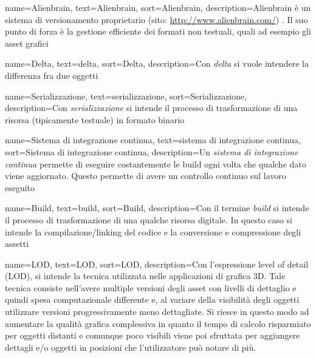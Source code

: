 {
	name=Alienbrain\textsuperscript{\textregistered},
	text=Alienbrain\textsuperscript{\textregistered},
	sort=Alienbrain,
	description={Alienbrain\textsuperscript{\textregistered} è un sistema di versionamento proprietario (sito: \url{http://www.alienbrain.com/}) . Il suo punto di forza è la gestione efficiente dei formati non testuali, quali ad esempio gli asset grafici}
}

{
	name=Delta,
	text=delta,
	sort=Delta,
	description={Con \emph{delta} si vuole intendere la differenza fra due oggetti}
}

{
	name=Serializzazione,
	text=serializzazione,
	sort=Serializzazione,
	description={Con \emph{serializzazione} si intende il processo di trasformazione di una risorsa (tipicamente testuale) in formato binario}
}

{
	name=Sistema di integrazione continua,
	text=sistema di integrazione continua,
	sort=Sistema di integrazione continua,
	description={Un \emph{sistema di integrazione continua} permette di eseguire costantemente le build ogni volta che qualche dato viene aggiornato. Questo permette di avere un controllo continuo sul lavoro eseguito}
}

{
	name=Build,
	text=build,
	sort=Build,
	description={Con il termine \emph{build} si intende il processo di trasformazione di una qualche risorsa digitale. In questo caso si intende la compilazione/linking del codice e la conversione e compressione degli assetti}
}

{
	name=LOD,
	text=LOD,
	sort=LOD,
	description={Con l'espressione level of detail (LOD), si intende la tecnica utilizzata nelle applicazioni di grafica 3D. Tale tecnica consiste nell'avere multiple versioni degli asset con livelli di dettaglio e quindi spesa computazionale differente e, al variare della visibilità degli oggetti utilizzare versioni progressivamente meno dettagliate. Si riesce in questo modo ad aumentare la qualità grafica complessiva in quanto il tempo di calcolo risparmiato per oggetti distanti e comunque poco visibili viene poi sfruttata per aggiungere dettagli e/o oggetti in posizioni che l'utilizzatore può notare di più.}
}